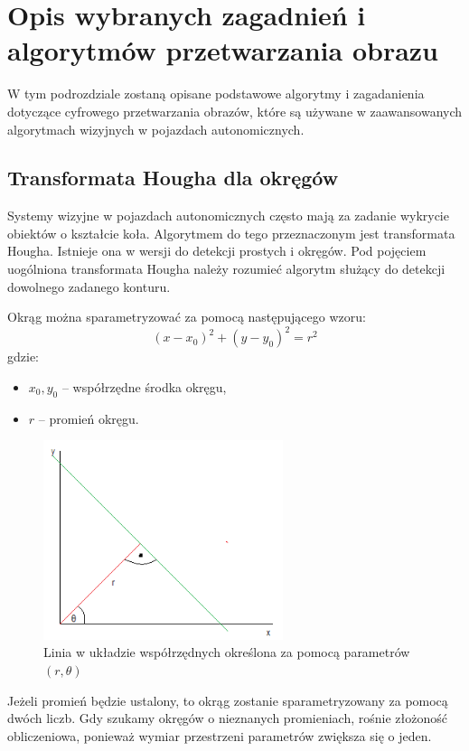 \section{Opis wybranych zagadnień i algorytmów przetwarzania obrazu}
\label{sec:vision_algs}
W tym podrozdziale zostaną opisane podstawowe algorytmy i zagadanienia dotyczące cyfrowego przetwarzania obrazów, które są używane w zaawansowanych algorytmach wizyjnych w pojazdach autonomicznych. 

\subsection{Transformata Hougha dla okręgów}

Systemy wizyjne w pojazdach autonomicznych często mają za zadanie wykrycie obiektów o kształcie koła. Algorytmem do tego przeznaczonym jest transformata Hougha. 
Istnieje ona w wersji do detekcji prostych i okręgów. 
Pod pojęciem uogólniona transformata Hougha należy rozumieć algorytm służący do detekcji dowolnego zadanego konturu.

Okrąg można sparametryzować za pomocą następującego wzoru:
\begin{equation}
(x-x_0)^2+(y-y_0)^2=r^2
\end{equation}
gdzie:
\begin{itemize}
\item $x_0, y_0$ -- współrzędne środka okręgu,
\item $r$ -- promień okręgu.
\end{itemize}

\begin{figure}[h]
\centering
\includegraphics[width=7cm]{img/hough.png}
\caption{Linia w układzie współrzędnych określona za pomocą parametrów $(r, \theta)$}
\label{fig:hough}
\end{figure}

Jeżeli promień będzie ustalony, to okrąg zostanie sparametryzowany za pomocą dwóch liczb. 
Gdy szukamy okręgów o nieznanych promieniach, rośnie złożoność obliczeniowa, ponieważ wymiar przestrzeni parametrów zwiększa się o jeden.

